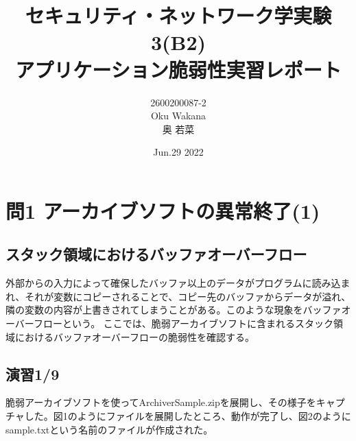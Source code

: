 \documentclass[dvipdfmx,autodetect-engine,titlepage]{jsarticle}
\title{セキュリティ・ネットワーク学実験3(B2)\\
アプリケーション脆弱性実習レポート\\
}
\author{2600200087-2\\Oku Wakana\\奥 若菜}
\date{Jun.29 2022}
\begin{document}
\maketitle

\section{問1 アーカイブソフトの異常終了(1)}
\subsection{スタック領域におけるバッファオーバーフロー}
外部からの入力によって確保したバッファ以上のデータがプログラムに読み込まれ、それが変数にコピーされることで、コピー先のバッファからデータが溢れ、隣の変数の内容が上書きされてしまうことがある。このような現象をバッファオーバーフローという。
ここでは、脆弱アーカイブソフトに含まれるスタック領域におけるバッファオーバーフローの脆弱性を確認する。\\
\subsection{演習1/9}
脆弱アーカイブソフトを使ってArchiverSample.zipを展開し、その様子をキャプチャした。図1のようにファイルを展開したところ、動作が完了し、図2のようにsample.txtという名前のファイルが作成された。\\
\end{document}
